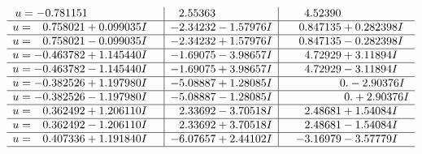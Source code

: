\documentclass[1p]{elsarticle_modified}
\theoremstyle{definition}
\begin{document}
$$\begin{array}{c|c|c}
\begin{aligned}
u &= -0.781151\phantom{ +0.000000I}\end{aligned}
 & \phantom{-}2.55363\phantom{ +0.000000I} & \phantom{-}4.52390\phantom{ +0.000000I} \\ \hline\begin{aligned}
u &= \phantom{-}0.758021 + 0.099035 I\end{aligned}
 & -2.34232 - 1.57976 I & \phantom{-}0.847135 + 0.282398 I \\ \hline\begin{aligned}
u &= \phantom{-}0.758021 - 0.099035 I\end{aligned}
 & -2.34232 + 1.57976 I & \phantom{-}0.847135 - 0.282398 I \\ \hline\begin{aligned}
u &= -0.463782 + 1.145440 I\end{aligned}
 & -1.69075 - 3.98657 I & \phantom{-}4.72929 + 3.11894 I \\ \hline\begin{aligned}
u &= -0.463782 - 1.145440 I\end{aligned}
 & -1.69075 + 3.98657 I & \phantom{-}4.72929 - 3.11894 I \\ \hline\begin{aligned}
u &= -0.382526 + 1.197980 I\end{aligned}
 & -5.08887 + 1.28085 I & \phantom{-0.000000 } 0. - 2.90376 I \\ \hline\begin{aligned}
u &= -0.382526 - 1.197980 I\end{aligned}
 & -5.08887 - 1.28085 I & \phantom{-0.000000 -}0. + 2.90376 I \\ \hline\begin{aligned}
u &= \phantom{-}0.362492 + 1.206110 I\end{aligned}
 & \phantom{-}2.33692 - 3.70518 I & \phantom{-}2.48681 + 1.54084 I \\ \hline\begin{aligned}
u &= \phantom{-}0.362492 - 1.206110 I\end{aligned}
 & \phantom{-}2.33692 + 3.70518 I & \phantom{-}2.48681 - 1.54084 I \\ \hline\begin{aligned}
u &= \phantom{-}0.407336 + 1.191840 I\end{aligned}
 & -6.07657 + 2.44102 I & -3.16979 - 3.57779 I\\
 \hline 
 \end{array}$$\newpage$$\begin{array}{c|c|c}  

\end{array}$$
\end{document}
